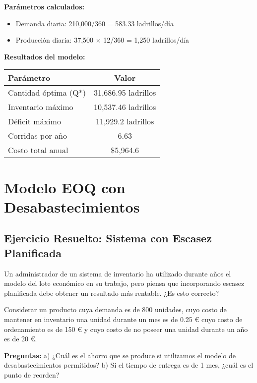 \documentclass[12pt,a4paper]{book}
\begin{document}
	\begin{tcolorbox}[enhanced,colback=azulclaro,colframe=azulprincipal,boxrule=2pt,arc=8pt,
		title={\bfseries\color{white} \faCalculator\ RESULTADOS}]
		
		\textbf{Parámetros calculados:}
		\begin{itemize}[leftmargin=*,label=\textcolor{azulprincipal}{\faArrowRight}]
			\item Demanda diaria: 210,000/360 = 583.33 ladrillos/día
			\item Producción diaria: 37,500 × 12/360 = 1,250 ladrillos/día
		\end{itemize}
		
		\textbf{Resultados del modelo:}
		\begin{center}
			\small
			\begin{tabular}{|l|c|}
				\hline
				\rowcolor{azulclaro}
				\textbf{Parámetro} & \textbf{Valor} \\
				\hline
				Cantidad óptima (Q*) & 31,686.95 ladrillos \\
				\hline
				Inventario máximo & 10,537.46 ladrillos \\
				\hline
				Déficit máximo & 11,929.2 ladrillos \\
				\hline
				Corridas por año & 6.63 \\
				\hline
				Costo total anual & \$5,964.6 \\
				\hline
			\end{tabular}
		\end{center}
		
	\end{tcolorbox}
	
	\section{Modelo EOQ con Desabastecimientos}
	
	\subsection{Ejercicio Resuelto: Sistema con Escasez Planificada}
	
	\begin{tcolorbox}[enhanced,colback=verdeclaro,colframe=verdeprincipal,boxrule=2pt,arc=8pt,
		drop shadow,title={\bfseries\color{white} \faPuzzlePiece\ PROBLEMA}]
		
		Un administrador de un sistema de inventario ha utilizado durante años el modelo del lote económico en su trabajo, pero piensa que incorporando escasez planificada debe obtener un resultado más rentable. ¿Es esto correcto?
		
		Considerar un producto cuya demanda es de 800 unidades, cuyo costo de mantener en inventario una unidad durante un mes es de 0.25 € cuyo costo de ordenamiento es de 150 € y cuyo costo de no poseer una unidad durante un año es de 20 €.
		
		\textbf{Preguntas:}
		a) ¿Cuál es el ahorro que se produce si utilizamos el modelo de desabastecimientos permitidos?
		b) Si el tiempo de entrega es de 1 mes, ¿cuál es el punto de reorden?
		
	\end{tcolorbox}
	
\end{document}
